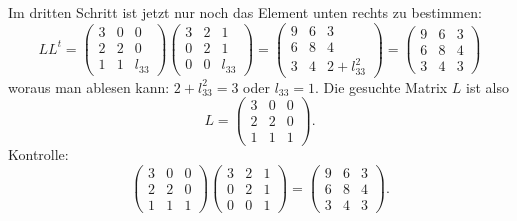 \begin{loesung}
Im dritten Schritt ist jetzt nur noch das Element unten rechts zu bestimmen:
\[
LL^t=
\begin{pmatrix}
3&0&     0\\
2&2&     0\\
1&1&l_{33}
\end{pmatrix}
\begin{pmatrix}
3&2&     1\\
0&2&     1\\
0&0&l_{33}
\end{pmatrix}
=
\begin{pmatrix}
9&6&3\\
6&8&4\\
3&4&2+l_{33}^2
\end{pmatrix}
=
\begin{pmatrix}
9&6&3\\
6&8&4\\
3&4&3
\end{pmatrix}
\]
woraus man ablesen kann: $2+l_{33}^2=3$ oder $l_{33}=1$. Die gesuchte
Matrix $L$ ist also
\[
L=
\begin{pmatrix}
3&0&0\\
2&2&0\\
1&1&1
\end{pmatrix}.
\]
Kontrolle:
\[
\begin{pmatrix}
3&0&0\\
2&2&0\\
1&1&1
\end{pmatrix}
\begin{pmatrix}
3&2&1\\
0&2&1\\
0&0&1
\end{pmatrix}
=
\begin{pmatrix}
9&6&3\\
6&8&4\\
3&4&3
\end{pmatrix}.
\]
\end{loesung}
